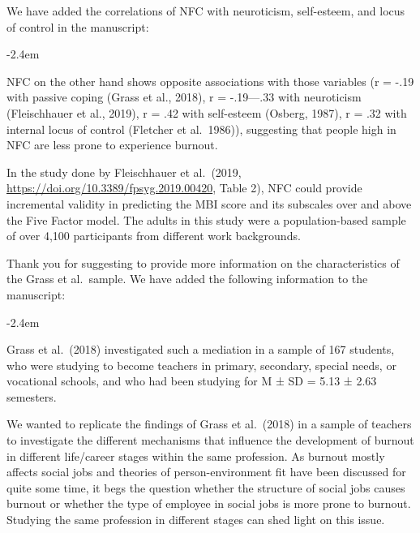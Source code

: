 \documentclass[draft]{article}
\renewenvironment{quote}{\begin{fquote}\advance\leftmargini -2.4em\begin{oldquote}}{\end{oldquote}\end{fquote}}
\newenvironment{fquote}
  {\def\FrameCommand{
	\fboxsep=0.6em %
	\fcolorbox{black}{white}}%
    \MakeFramed {\advance\hsize-2\width \FrameRestore}
    \begin{minipage}{\linewidth}
  }
  {\end{minipage}\endMakeFramed}
\begin{document}
We have added the correlations of NFC with neuroticism, self-esteem, and locus of control in the manuscript:

\begin{quote}
NFC on the other hand shows opposite associations with those variables (r = -.19 with passive coping (Grass et al., 2018), r = -.19---.33 with neuroticism (Fleischhauer et al., 2019), r = .42 with self-esteem (Osberg, 1987), r = .32 with internal locus of control (Fletcher et al.~1986)), suggesting that people high in NFC are less prone to experience burnout.
\end{quote}

In the study done by Fleischhauer et al.~(2019, \url{https://doi.org/10.3389/fpsyg.2019.00420}, Table 2), NFC could provide incremental validity in predicting the MBI score and its subscales over and above the Five Factor model.
The adults in this study were a population-based sample of over 4,100 participants from different work backgrounds.

Thank you for suggesting to provide more information on the characteristics of the Grass et al.~sample.
We have added the following information to the manuscript:

\begin{quote}
Grass et al.~(2018) investigated such a mediation in a sample of 167 students, who were studying to become teachers in primary, secondary, special needs, or vocational schools, and who had been studying for M ± SD = 5.13 ± 2.63 semesters.
\end{quote}

We wanted to replicate the findings of Grass et al.~(2018) in a sample of teachers to investigate the different mechanisms that influence the development of burnout in different life/career stages within the same profession.
As burnout mostly affects social jobs and theories of person-environment fit have been discussed for quite some time, it begs the question whether the structure of social jobs causes burnout or whether the type of employee in social jobs is more prone to burnout.
Studying the same profession in different stages can shed light on this issue.

\end{document}
